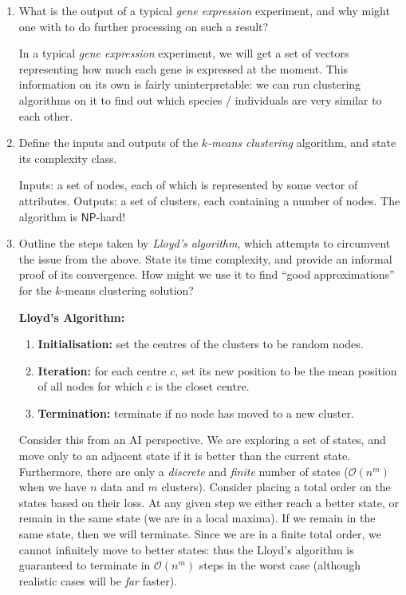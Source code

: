 \documentclass[10pt,\jkfside,a4paper]{article}
\begin{document}
\begin{enumerate}

    \item What is the output of a typical \textit{gene expression} experiment, and why might one with to do further processing on such a result?

    In a typical \textit{gene expression} experiment, we will get a set of vectors representing how much each gene is expressed at the moment. This information on its own is fairly uninterpretable: we can run
    clustering algorithms on it to find out which species / individuals are very similar to each other.

    \item Define the inputs and outputs of the \textit{$k$-means clustering} algorithm, and state its complexity class.

    Inputs: a set of nodes, each of which is represented by some vector of attributes. Outputs: a set of clusters, each containing a number of nodes. The algorithm is $\mathsf{NP}$-hard!

    \item Outline the steps taken by \textit{Lloyd's algorithm}, which attempts to circumvent the issue from the above. State its time complexity, and provide an informal proof of its convergence. How might we
    use it to find ``good approximations'' for the $k$-means clustering solution?

    \textbf{Lloyd's Algorithm:}

    \begin{enumerate}

        \item \textbf{Initialisation:} set the centres of the clusters to be random nodes.

        \item \textbf{Iteration:} for each centre $c$, set its new position to be the mean position of all nodes for which $c$ is the closet centre.

        \item \textbf{Termination:} terminate if no node has moved to a new cluster.

    \end{enumerate}

    Consider this from an AI perspective. We are exploring a set of states, and move only to an adjacent state if it is better than the current state. Furthermore, there are only a \textit{discrete} and
    \textit{finite} number of states ($\mathcal O(n^m)$ when we have $n$ data and $m$ clusters). Consider placing a total order on the states based on their loss. At any given step we either reach a better
    state, or remain in the same state (we are in a local maxima). If we remain in the same state, then we will terminate. Since we are in a finite total order, we cannot infinitely move to better states: thus the
    Lloyd's algorithm is guaranteed to terminate in $\mathcal O(n^m)$ steps in the worst case (although realistic cases will be \textit{far} faster).


\end{enumerate}
\end{document}
